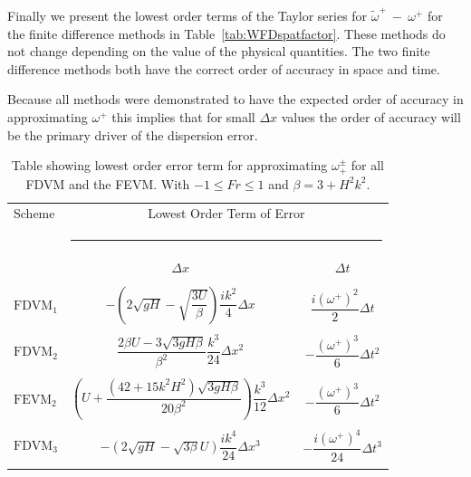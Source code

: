 Finally we present the lowest order terms of the Taylor series for $\widetilde{\omega}^+~-~\omega^+$ for the finite difference methods in Table~\ref{tab:WFDspatfactor}. These methods do not change depending on the value of the physical quantities. The two finite difference methods both have the correct order of accuracy in space and time.  

Because all methods were demonstrated to have the expected order of accuracy in approximating $\omega^+$ this implies that for small $\Delta x$ values the order of accuracy will be the primary driver of the dispersion error.

	\begin{table}
		\begin{tabular}{l  c  c}
		\hline
			Scheme & \multicolumn{2}{c}{Lowest Order Term of Error}\\
			&  \multicolumn{2}{l}{\rule{0.7\textwidth}{0.4pt}} \\
			& $\Delta x$&$\Delta t$\\
			\hline && \\
			$\text{FDVM}_1$& $-\left(2 \sqrt{gH} - \sqrt{\dfrac{3U}{\beta }}\right)  \dfrac{ik^2}{4} \Delta x$ & $\dfrac{i \left(\omega^+\right)^2}{2} \Delta t$ \\ & & \\
			$\text{FDVM}_2$& $\dfrac{2\beta U -3 \sqrt{3 gH \beta}}{\beta^2}  \dfrac{k^3}{24}\Delta x ^2$ & $- \dfrac{\left(\omega^+\right)^3}{6 }  \Delta t^2$ \\ & & \\
			$\text{FEVM}_2$& $\left(U   + \dfrac{\left(42 + 15 k^2H^2\right) \sqrt{3gH \beta}}{20\beta^2}  \right) \dfrac{k^3}{12 } \Delta x^2$ &  $- \dfrac{\left(\omega^+\right)^3}{6 }  \Delta t^2$  \\ & & \\
			$\text{FDVM}_3$& $-\left({2\sqrt{gH} - \sqrt{3\beta}U }\right) \dfrac{ik^4}{24} \Delta x^3$ & $-\dfrac{i\left(\omega^+\right)^4}{24 } \Delta t^3$ \\ \\ \hline
		\end{tabular}
		\caption{Table showing lowest order error term for approximating $\omega^\pm_+$ for all FDVM and the FEVM. With $  -1 \le Fr \le 1$ and $\beta = 3 + H^2 k^2 $. }
		\label{tab:Wfactor} 
	\end{table}

